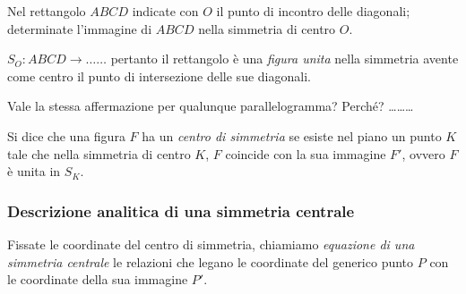 \begin{exrig}
\begin{esempio}
Nel rettangolo $ABCD$ indicate con $O$ il punto di incontro delle 
diagonali; determinate l'immagine di $ABCD$ nella simmetria di centro 
$O$.

$S_O:ABCD \rightarrow \ldots\ldots{}$ pertanto il rettangolo è una 
\emph{figura unita} nella simmetria avente come centro il punto di 
intersezione delle sue diagonali.

\begin{figure*}[!htb]
    \centering
\end{figure*}

Vale la stessa affermazione per qualunque parallelogramma? Perché? 
\ldots\ldots\ldots{}

\begin{figure*}[!htb]
    \centering
\end{figure*}

\end{esempio}
\end{exrig}

\begin{definizione}
Si dice che una figura $F$ ha un \emph{centro di simmetria} se esiste 
nel piano un punto $K$ tale che nella simmetria di centro $K$, $F$ 
coincide con la sua immagine $F'$, ovvero $F$ è unita in $S_K$. 
\end{definizione}

\subsubsection{Descrizione analitica di una simmetria centrale}

\begin{definizione}
Fissate le coordinate del centro di simmetria, chiamiamo 
\emph{equazione di una simmetria centrale} le relazioni che legano le 
coordinate del generico punto $P$ con le coordinate della sua 
immagine $P'$.
\end{definizione}

